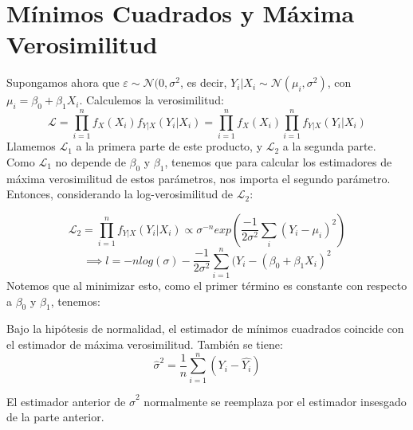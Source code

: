 \section{Mínimos Cuadrados y Máxima Verosimilitud}
Supongamos ahora que $\varepsilon \sim \mathcal{N}(0,\sigma^2$, es decir, 
$Y_i|X_i \sim \mathcal{N}(\mu_i,\sigma^2)$, con $\mu_i=\beta_0 + \beta_1 X_i$.
Calculemos la verosimilitud: 
$$
\mathcal{L}=\prod_{i=1}^{n}f_{X}(X_i) f_{Y|X}(Y_i|X_i)= \prod_{i=1}^{n}f_{X}(X_i) \prod_{i=1}^{n}f_{Y|X}(Y_i|X_i)
$$
Llamemos $\mathcal{L}_1$ a la primera parte de este producto, y $\mathcal{L}_2$ a la segunda parte. Como $\mathcal{L}_1$ no depende de $\beta_0 $ y $\beta_1$, tenemos que para calcular los estimadores de máxima verosimilitud de estos parámetros, nos importa el segundo parámetro. Entonces, considerando la log-verosimilitud de $\mathcal{L}_2$:

$$ \mathcal{L}_2 = \prod_{i=1}^{n} f_{Y|X}(Y_i|X_i) \propto \sigma^{-n} exp(\dfrac{-1}{2\sigma^2}\sum_{i} (Y_i-\mu_i)^2) 
$$ 
$$
\implies l=-nlog(\sigma)-\dfrac{-1}{2\sigma^2}\sum_{i=1}^{n}(Y_i-(\beta_0 + \beta_1 X_i)^2
$$
Notemos que al minimizar esto, como el primer término es constante con respecto a $\beta_0 $ y $\beta_1$, tenemos: 
\begin{theorem}
Bajo la hipótesis de normalidad, el estimador de mínimos cuadrados coincide con el estimador de máxima verosimilitud. También se tiene: 
$$
\hat{\sigma}^2=\dfrac{1}{n} \sum_{i=1}^{n}(Y_i-\hat{Y_i})
$$
\end{theorem}
\begin{remark}
El estimador anterior de $\hat{\sigma}^2$ normalmente se reemplaza por el estimador insesgado de la parte anterior. 
\end{remark}

